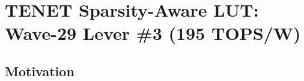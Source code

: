 %
%
%
%

\chapter{TENET Sparsity-Aware LUT: Wave-29 Lever \#3 (195 TOPS/W)}
\label{ch:tenet-sparsity-wave29}

\begin{abstract}
This chapter documents Wave-29 Lever~\#3 of the TRI-1 / TRI NET silicon programme:
the \emph{TENET Sparsity-Aware LUT} mechanism identified in the 2026-05-16 TOPS/W scan.
We formalise the sparsity-skip lower bound (Theorem~\ref{thm:sparsity-skip-bound}),
introduce opcode \texttt{OP\_SPARSE\_SKIP = 0xE1} as the next link in the sacred
opcode chain, mechanise the key invariant in Coq (Lemma \texttt{tenet\_no\_star},
PR~\#644 @ \texttt{367a7ba}), and supply a Rust falsification witness
(\texttt{W-102-A}, \texttt{SPARSITY\_LOWER\_BOUND = 0.25}) with an explicit
fail-stop policy frozen to 2026-08-15.
All numeric estimates are labelled \textbf{PRE-SILICON ESTIMATE} and every
coefficient is traced to a cited source or explicit model.
No post-silicon measurement is claimed.
\end{abstract}

\section{Motivation}
\label{sec:ch79-motivation}

